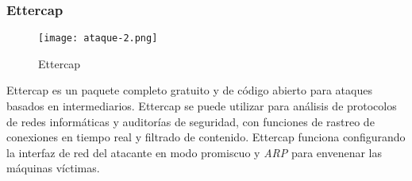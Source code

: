 \subsubsection*{Ettercap}

\begin{center}
   \begin{figure}   
      \begin{center}
         \texttt{[image: ataque-2.png]}
      \end{center}
      \caption{Ettercap}
   \end{figure}
\end{center}

Ettercap es un paquete completo gratuito y de código abierto para ataques basados 
en intermediarios. Ettercap se puede utilizar para análisis de protocolos de redes 
informáticas y auditorías de seguridad, con funciones de rastreo de conexiones en 
tiempo real y filtrado de contenido. Ettercap funciona configurando la interfaz de red 
del atacante en modo promiscuo y \emph{ARP} para envenenar las máquinas víctimas.

